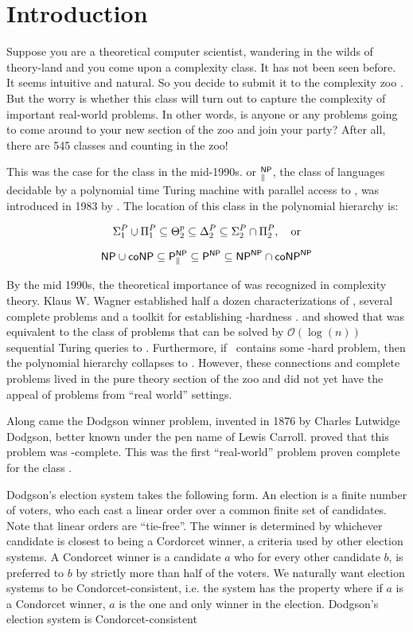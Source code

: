 \section{Introduction}\label{sec:intro}

    Suppose you are a theoretical computer scientist, wandering in the wilds
of theory-land and you come upon a complexity class.
It has not been seen before.
It seems intuitive and natural.
So you decide to submit it to the complexity zoo \citep{zoo}.
But the worry is whether this class will turn out to capture the complexity
of important real-world problems.
In other words, is anyone or any problems going to come around to your new
section of the zoo and join your party?
After all, there are 545 classes and counting
in the zoo!

This was the case for the class \tp in the mid-1990s.
\tp or $^{\mathsf{NP}}_{\parallel}$, the class of
languages decidable by a polynomial time Turing machine with parallel access to
\np, was introduced in 1983 by \citet{PZ83}.
The location of this class in the polynomial hierarchy is:


   $$\Sigma^{P}_{1} \cup \Pi^{P}_{1} \subseteq
    \Theta^{p}_2 \subseteq \Delta^{P}_2
    \subseteq \Sigma^{P}_{2} \cap \Pi^{P}_{2},~~~\text{or}$$

  $$\mathsf{NP} \cup \mathsf{coNP} \subseteq \mathsf{P}^{\mathsf{NP}}_{\parallel}
    \subseteq \mathsf{P}^{\mathsf{NP}} \subseteq \mathsf{NP}^{\mathsf{NP}} \cap \mathsf{coNP}^{\mathsf{NP}}$$


By the mid 1990s, the theoretical importance of \tp was recognized in complexity theory.
Klaus W. Wagner established half a dozen characterizations of \tp,
several complete problems and a toolkit for establishing \tp-hardness \citep{wag90}.
\citet{hem87} and \citet{ksw87} showed that \tp was equivalent to the class of
problems that can be solved by $\mathcal{O}(\log(n))$ sequential Turing queries to \np.
Furthermore, if \np~contains some \tp-hard problem, then the polynomial hierarchy
collapses to \np.
However, these connections and complete problems
lived in the pure theory section of the zoo and did not yet have the appeal of
problems from ``real world'' settings.

Along came the Dodgson winner problem, invented in 1876 by Charles Lutwidge
Dodgson, better known under the pen name of Lewis Carroll.
\citet{exactdodgson} proved that this problem was \tp-complete.
This was the first ``real-world'' problem proven complete for the class \tp.

Dodgson's election system takes the following form.
An election is a finite number of voters, who each cast a linear order
over a common finite set of candidates.
Note that linear orders are ``tie-free''.
The winner is determined by whichever candidate is closest to being a Cordorcet
winner, a criteria used by other election systems.
A Condorcet winner is a candidate $a$ who for every other candidate $b$, is
preferred to $b$ by strictly more than half of the voters.
We naturally want election systems to be Condorcet-consistent, i.e. the system
has the property where if $a$ is a Condorcet winner, $a$ is the one and only
winner in the election.
Dodgson's election system is Condorcet-consistent \citep{handbookcss}

